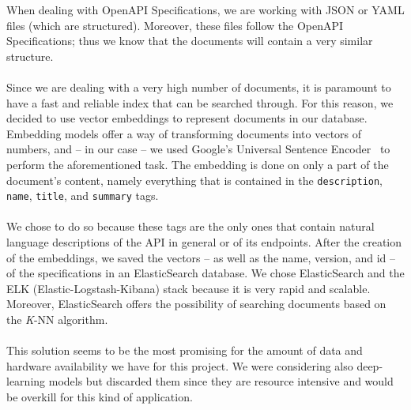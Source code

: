 When dealing with OpenAPI Specifications, we are working with JSON or YAML files (which are structured).
Moreover, these files follow the OpenAPI Specifications; thus we know that the documents will contain a very similar structure. \\ \\
Since we are dealing with a very high number of documents, it is paramount to have a fast and reliable index that can be searched through.
For this reason, we decided to use vector embeddings to represent documents in our database.
Embedding models offer a way of transforming documents into vectors of numbers, and -- in our case -- we used Google's Universal Sentence Encoder~\cite{cer2018universal} to perform the aforementioned task.
The embedding is done on only a part of the document's content, namely everything that is contained in the \verb|description|, \verb|name|, \verb|title|, and \verb|summary| tags. \\ \\
We chose to do so because these tags are the only ones that contain natural language descriptions of the API in general or of its endpoints.
After the creation of the embeddings, we saved the vectors -- as well as the name, version, and id -- of the specifications in an ElasticSearch database.
We chose ElasticSearch and the ELK (Elastic-Logstash-Kibana) stack because it is very rapid and scalable.
Moreover, ElasticSearch offers the possibility of searching documents based on the \textit{K}-NN algorithm. \\ \\
This solution seems to be the most promising for the amount of data and hardware availability we have for this project.
We were considering also deep-learning models but discarded them since they are resource intensive and would be overkill for this kind of application.
